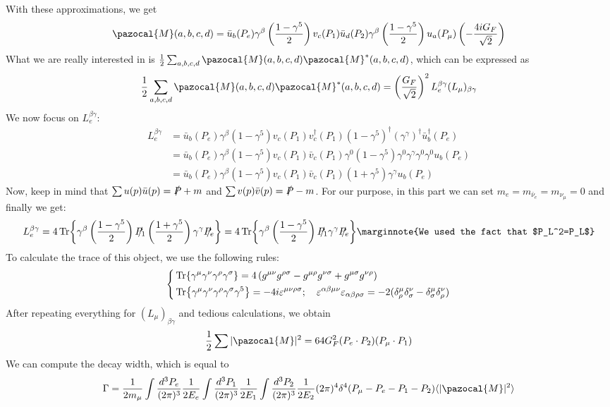 \documentclass[../main.tex]{subfiles}
\begin{document}
With these approximations, we get
\[
\pazocal{M}(a,b,c,d)=\bar{u}_b(P_e)\gamma^\beta\left(\frac{1-\gamma^5}{2}\right)v_c(P_1)\bar{u}_d(P_2)\gamma^\beta\left(\frac{1-\gamma^5}{2}\right)u_a(P_\mu)\left(-\frac{4iG_F}{\sqrt{2}}\right)
\]
What we are really interested in is $\frac{1}{2}\sum_{a,b,c,d}\pazocal{M}(a,b,c,d)\pazocal{M}^*(a,b,c,d)$, which can be expressed as
\[
\frac{1}{2}\sum_{a,b,c,d}\pazocal{M}(a,b,c,d)\pazocal{M}^*(a,b,c,d)=\left(\frac{G_F}{\sqrt{2}}\right)^2L_e^{\beta\gamma}(L_\mu)_{\beta\gamma}
\]
We now focus on $L_e^{\beta\gamma}$:
\begin{align*}
L_e^{\beta\gamma}&=\bar{u}_b(P_e)\gamma^\beta(1-\gamma^5)v_c(P_1)v_c^\dagger(P_1)(1-\gamma^5)^\dagger(\gamma^\gamma)^\dagger\bar{u}_b^\dagger(P_e)\\
&=\bar{u}_b(P_e)\gamma^\beta(1-\gamma^5)v_c(P_1)\bar{v}_c(P_1)\gamma^0(1-\gamma^5)\gamma^0\gamma^\gamma\gamma^0\gamma^0u_b(P_e)\\
&=\bar{u}_b(P_e)\gamma^\beta(1-\gamma^5)v_c(P_1)\bar{v}_c(P_1)(1+\gamma^5)\gamma^\gamma u_b(P_e)
\end{align*}
Now, keep in mind that $\sum u(p)\bar{u}(p)=\slashed{P}+m$ and $\sum v(p)\bar{v}(p)=\slashed{P}-m$. For our purpose, in this part we can set $m_e=m_{\bar{\nu}_e}=m_{\nu_\mu}=0$ and finally we get:
\[
L_e^{\beta\gamma}=4\Tr{\gamma^\beta\left(\frac{1-\gamma^5}{2}\right)\slashed{P_1}\left(\frac{1+\gamma^5}{2}\right)\gamma^\gamma\slashed{P_e}}=4\Tr{\gamma^\beta\left(\frac{1-\gamma^5}{2}\right)\slashed{P_1}\gamma^\gamma\slashed{P_e}}\marginnote{We used the fact that $P_L^2=P_L$}
\]
To calculate the trace of this object, we use the following rules:
\[
\left\{
\begin{aligned}
&\Tr{\gamma^\mu\gamma^\nu\gamma^\rho\gamma^\sigma}=4\left(g^{\mu\nu}g^{\rho\sigma}-g^{\mu\rho}g^{\nu\sigma}+g^{\mu\sigma}g^{\nu\rho}\right)\\
&\Tr{\gamma^\mu\gamma^\nu\gamma^\rho\gamma^\sigma\gamma^5}=-4i\varepsilon^{\mu\nu\rho\sigma}; \quad \varepsilon^{\alpha\beta\mu\nu}\varepsilon_{\alpha\beta\rho\sigma}=-2(\delta^\mu_\rho\delta^\nu_\sigma-\delta^\mu_\sigma\delta^\nu_\rho)
\end{aligned}
\right.
\]
After repeating everything for $(L_\mu)_{\beta\gamma}$ and tedious calculations, we obtain
\[
\frac{1}{2}\sum|\pazocal{M}|^2=64G^2_F(P_e\cdot P_2)(P_\mu\cdot P_1)
\]
We can compute the decay width, which is equal to
\[
\Gamma=\frac{1}{2m_\mu}\int\frac{d^3P_e}{(2\pi)^3}\frac{1}{2E_e}\int\frac{d^3P_1}{(2\pi)^3}\frac{1}{2E_1}\int\frac{d^3P_2}{(2\pi)^3}\frac{1}{2E_2}(2\pi)^4\delta^4(P_\mu-P_e-P_1-P_2)\langle|\pazocal{M}|^2\rangle
\]
\end{document}
